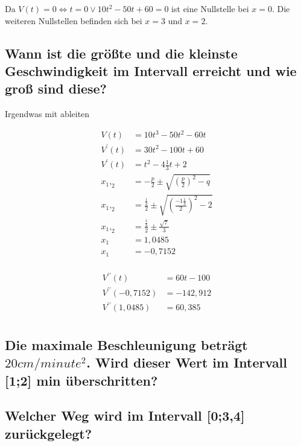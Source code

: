 \documentclass[a4paper,11pt]{scrartcl}
\begin{document}
Da $V(t) = 0 \Leftrightarrow t = 0 \vee 10t^2 - 50t + 60 = 0$ ist eine
Nullstelle bei $x = 0$. Die weiteren Nullstellen befinden sich bei $x = 3$ und
$x = 2$.

\subsection{Wann ist die größte und die kleinste Geschwindigkeit im Intervall
erreicht und wie groß sind diese?}

\begin{outline}
  \1 Irgendwas mit ableiten
\end{outline}

\begin{align*}
  V(t) &= 10t^3 - 50t^2 - 60t                               \\
  V^\prime(t) &= 30t^2 - 100t + 60  \\
  V^\prime(t) &= t^2  - 4\frac{1}{3}t + 2  \\
  x_1,_2 &= -\frac{p}{2} \pm \sqrt{\left(\frac{p}{2}\right)^2 - q} \\
  x_1,_2 &= \frac{\frac{1}{3}}{2} \pm \sqrt{\left(\frac{-1\frac{1}{3}}{2}\right)^2 - 2} \\
  x_1,_2 &= \frac{\frac{1}{3}}{2} \pm \frac{{\sqrt{7}}}{3} \\
  x_1   &= 1,0485  \\
  x_1   &= -0,7152  \\
\end{align*}

\begin{align*}
  V^{\prime\prime}(t) &= 60t - 100      \\
  V^{\prime\prime}(-0,7152) &= -142,912 \\
  V^{\prime\prime}(1,0485) &= 60,385    \\
\end{align*}

\subsection{Die maximale Beschleunigung beträgt $20cm / minute^2$. Wird dieser
Wert im Intervall [1;2] min überschritten?}

\subsection{Welcher Weg wird im Intervall [0;3,4] zurückgelegt?}
\end{document}
